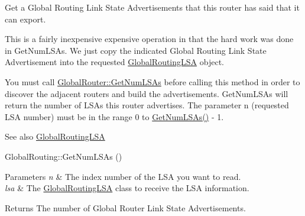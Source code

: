 Get a Global Routing Link State Advertisements that this router has said that it can export. 

This is a fairly inexpensive expensive operation in that the hard work was done in Get\+Num\+L\+S\+As. We just copy the indicated Global Routing Link State Advertisement into the requested \hyperlink{classns3_1_1GlobalRoutingLSA}{Global\+Routing\+L\+SA} object.

You must call \hyperlink{classns3_1_1GlobalRouter_addd8a89e462a36660a3f68dec959bb19}{Global\+Router\+::\+Get\+Num\+L\+S\+As} before calling this method in order to discover the adjacent routers and build the advertisements. Get\+Num\+L\+S\+As will return the number of L\+S\+As this router advertises. The parameter n (requested L\+SA number) must be in the range 0 to \hyperlink{classns3_1_1GlobalRouter_addd8a89e462a36660a3f68dec959bb19}{Get\+Num\+L\+S\+As()} -\/ 1.

\begin{DoxySeeAlso}{See also}
\hyperlink{classns3_1_1GlobalRoutingLSA}{Global\+Routing\+L\+SA} 

Global\+Routing\+::\+Get\+Num\+L\+S\+As () 
\end{DoxySeeAlso}

\begin{DoxyParams}{Parameters}
{\em n} & The index number of the L\+SA you want to read. \\
\hline
{\em lsa} & The \hyperlink{classns3_1_1GlobalRoutingLSA}{Global\+Routing\+L\+SA} class to receive the L\+SA information. \\
\hline
\end{DoxyParams}
\begin{DoxyReturn}{Returns}
The number of Global Router Link State Advertisements. 
\end{DoxyReturn}

